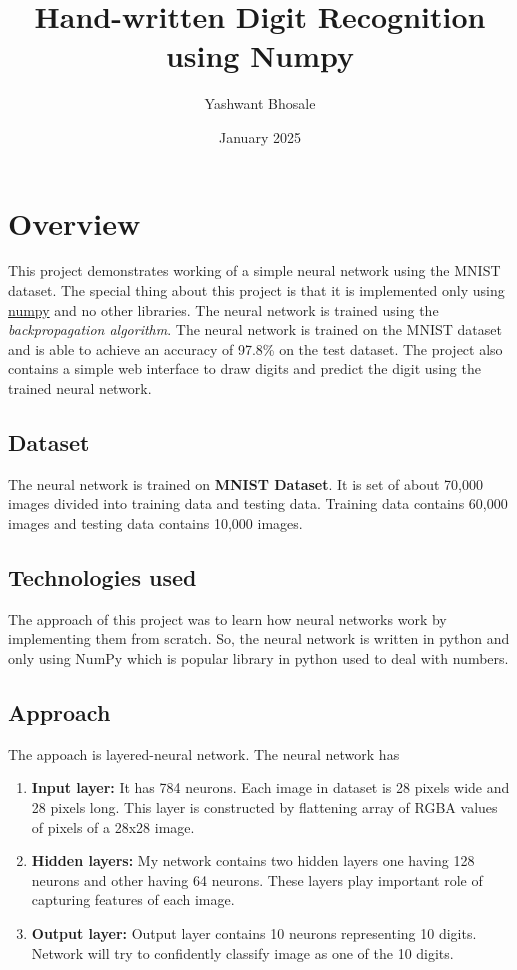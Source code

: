 \documentclass[twoside]{article}
\title{Hand-written Digit Recognition using Numpy}
\author{Yashwant Bhosale}
\date{January 2025}
\begin{document}
\maketitle

\hypersetup{pdfborder= 0 0 0}
\tableofcontents
\newpage

\section{Overview}
This project demonstrates working of a simple neural network using the MNIST dataset. The special thing about this project is that it is implemented only using \underline{numpy} and no other libraries. The neural network is trained using the \textit{backpropagation algorithm}. The neural network is trained on the MNIST dataset and is able to achieve an accuracy of 97.8\% on the test dataset. The project also contains a simple web interface to draw digits and predict the digit using the trained neural network.

\subsection{Dataset}
The neural network is trained on \textbf{MNIST Dataset}. It is set of about 70,000 images divided into training data and testing data. Training data contains 60,000 images and testing data contains 10,000 images.

\subsection{Technologies used}
The approach of this project was to learn how neural networks work by implementing them from scratch.
So, the neural network is written in python and only using NumPy which is popular library in python used to deal with numbers.

\subsection{Approach}
The appoach is layered-neural network. The neural network has
\begin{enumerate}
    \item \textbf{Input layer:} It has 784 neurons. Each image in dataset is 28 pixels wide and 28 pixels long. This layer is constructed by flattening array of RGBA values of pixels of a 28x28 image.
    \item \textbf{Hidden layers:} My network contains two hidden layers one having 128 neurons and other having 64 neurons. These layers play important role of capturing features of each image.
    \item \textbf{Output layer:} Output layer contains 10 neurons representing 10 digits. Network will try to confidently classify image as one of the 10 digits.
\end{enumerate}
\end{document}

